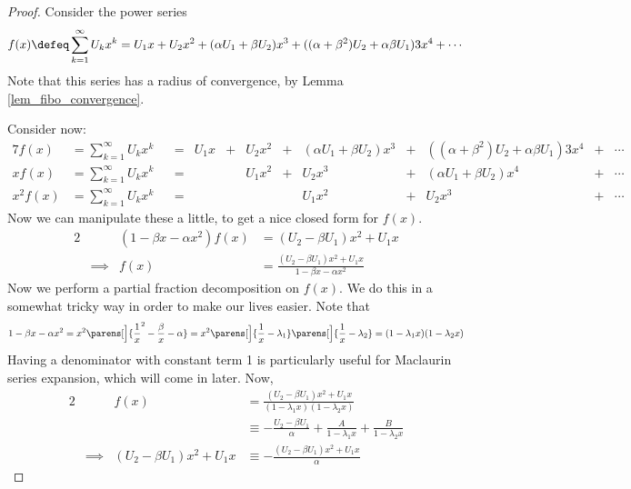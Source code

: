 \begin{proof}
 Consider the power series
 \begin{equation*}
  f(x) \defeq \sum_{k=1}^\infty U_k x^k
            = U_1 x + U_2 x^2 + (\alpha U_1 + \beta U_2) x^3
            + ((\alpha + \beta^2)U_2 + \alpha \beta U_1)3x^4 + \dotsb
 \end{equation*}
 Note that this series has a radius of convergence, by Lemma
 \ref{lem_fibo_convergence}.

 Consider now:
 \begin{alignat*}7
  f(x) &= \sum_{k = 1}^\infty U_k x^k
   &&={}& U_1 x &+{}& U_2 x^2 &+{}& (\alpha U_1 + \beta U_2) x^3
       &+{}& ((\alpha + \beta^2)U_2 + \alpha \beta U_1)3x^4
       &+{}& \dotsb \\
  x f(x) &= \sum_{k = 1}^\infty U_k x^k
   &&={}& && U_1 x^2 &+{}& U_2 x^3 &+{}& (\alpha U_1 + \beta U_2) x^4
       &+{}& \dotsb \\
  x^2 f(x) &= \sum_{k = 1}^\infty U_k x^k
   &&={}& &&&& U_1 x^2 &+{}& U_2 x^3 &+{}& \dotsb
 \end{alignat*}
 Now we can manipulate these a little, to get a nice closed form for \(f(x)\).
 \begin{alignat*}2
  && (1 - \beta x - \alpha x^2) f(x) &= (U_2 - \beta U_1)x^2 + U_1 x \\
  &\implies{}& f(x) &= \frac{(U_2 - \beta U_1)x^2 + U_1 x}
                            {1 - \beta x - \alpha x^2}
 \end{alignat*}
 Now we perform a partial fraction decomposition on \(f(x)\). We do this in a
 somewhat tricky way in order to make our lives easier. Note that
 \begin{equation*}
  1 - \beta x - \alpha x^2 = x^2 \parens[\Big]
        {\frac 1x^2 - \frac \beta x - \alpha}
      = x^2\parens[\Big]{\frac 1x - \lambda_1}
           \parens[\Big]{\frac 1x - \lambda_2}
      = (1 - \lambda_1 x)(1 - \lambda_2 x)
 \end{equation*}
 Having a denominator with constant term 1 is particularly useful for Maclaurin
 series expansion, which will come in later. Now,
 \begin{alignat*}2
  && f(x) &= \frac{(U_2 - \beta U_1)x^2 + U_1 x}
                 {(1 - \lambda_1 x)(1 - \lambda_2 x)} \\
  && &\equiv - \frac{U_2 - \beta U_1}\alpha +
                \frac A{1 - \lambda_1 x} + \frac B{1 - \lambda_2 x} \\
  &\implies{}& (U_2 - \beta U_1)x^2 + U_1 x &\equiv
               -\frac{(U_2 - \beta U_1)x^2 + U_1 x}\alpha

\end{alignat*}
\end{proof}
